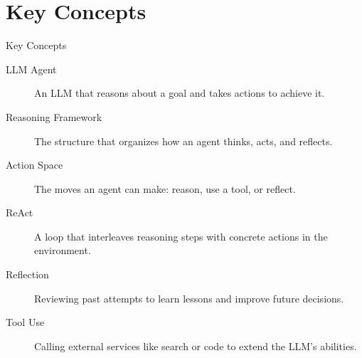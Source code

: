 \documentclass[10pt]{beamer}
\begin{document}
\section{Key Concepts}
\begin{frame}[allowframebreaks]{Key Concepts}
  \begin{description}
    \item[LLM Agent] An LLM that reasons about a goal and takes actions to achieve it.
    \item[Reasoning Framework] The structure that organizes how an agent thinks, acts, and reflects.
    \item[Action Space] The moves an agent can make: reason, use a tool, or reflect.
    \item[ReAct] A loop that interleaves reasoning steps with concrete actions in the environment.
    \item[Reflection] Reviewing past attempts to learn lessons and improve future decisions.
    \item[Tool Use] Calling external services like search or code to extend the LLM's abilities.
  \end{description}
\end{frame}
\end{document}
